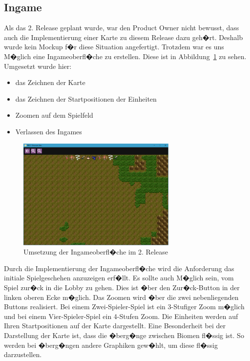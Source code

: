 \documentclass[12pt, titlepage]{scrartcl}
\newcommand{\Abb}[1]{%
	Abbildung\ \ref{#1}%
}
\begin{document}
			\subsection{Ingame}
			Als das 2. Release geplant wurde, war den Product Owner nicht bewusst, dass auch die Implementierung einer Karte zu diesem Release dazu geh�rt. Deshalb wurde kein Mockup f�r diese Situation angefertigt. Trotzdem war es uns M�glich eine Ingameoberfl�che zu erstellen. Diese ist in \Abb{Ingame} zu sehen. Umgesetzt wurde hier:
			\begin{itemize}
				\item das Zeichnen der Karte
				\item das Zeichnen der Startpositionen der Einheiten
				\item Zoomen auf dem Spielfeld
				\item Verlassen des Ingames
			\end{itemize}
			\begin{figure}[H] 
				\centering
				\includegraphics[width=0.7\textwidth]{Ingame_final.PNG}
				\caption{Umsetzung der Ingameoberfl�che im 2. Release}
				\label{Ingame}
			\end{figure}
			Durch die Implementierung der Ingameoberfl�che wird die Anforderung das initiale Spielgeschehen anzuzeigen erf�llt. Es sollte auch M�glich sein, vom Spiel zur�ck in die Lobby zu gehen. Dies ist �ber den Zur�ck-Button in der linken oberen Ecke m�glich. Das Zoomen wird �ber die zwei nebenliegenden Buttons realisiert. Bei einem Zwei-Spieler-Spiel ist ein 3-Stufiger Zoom m�glich und bei einem Vier-Spieler-Spiel ein 4-Stufen Zoom. Die Einheiten werden auf Ihren Startpositionen auf der Karte dargestellt. Eine Besonderheit bei der Darstellung der Karte ist, dass die �berg�nge zwischen Biomen fl�ssig ist. So werden bei �berg�ngen andere Graphiken gew�hlt, um diese fl�ssig darzustellen.
			
\end{document}

